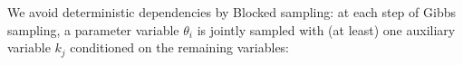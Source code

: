 We avoid deterministic dependencies by Blocked sampling:
at each step of Gibbs sampling, a parameter variable $\theta_i$ is jointly sampled with  
(at least) one  
auxiliary variable $k_j$ 
conditioned on the remaining variables:
